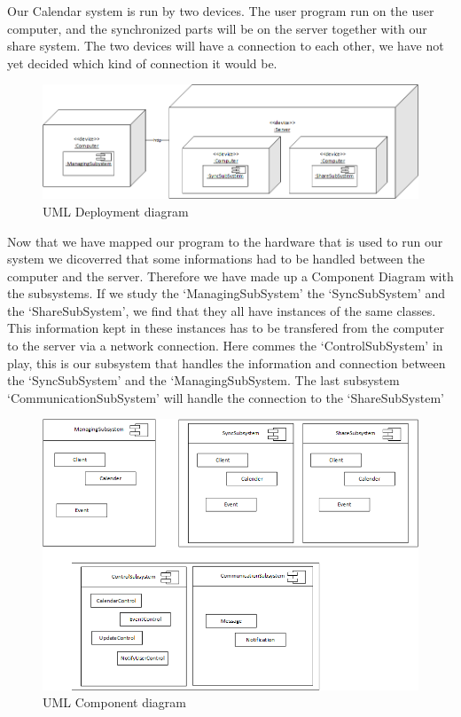 Our Calendar system is run by two devices. The user program run on the user computer, and the synchronized parts will be on the server together with our share system. The two devices will have a connection to each other, we have not yet decided which kind of connection it would be.

\begin{figure}[ht!]
\centering
\includegraphics[width=160mm]{UMLDeployment.png}
\caption{UML Deployment diagram \label{overflow}}
\end{figure}

Now that we have mapped our program to the hardware that is used to run our system we dicoverred that some informations had to be handled between the computer and the server. Therefore we have made up a Component Diagram with the subsystems. If we study the ‘ManagingSubSystem’ the ‘SyncSubSystem’ and the ‘ShareSubSystem’, we find that they all have instances of the same classes. This information kept in these instances has to be transfered from the computer to the server via a network connection. Here commes the ‘ControlSubSystem’ in play, this is our subsystem that handles the information and connection between the ‘SyncSubSystem’ and the ‘ManagingSubSystem. The last subsystem ‘CommunicationSubSystem’ will handle the connection to the ‘ShareSubSystem’

\begin{figure}[ht!]
\centering
\includegraphics[width=160mm]{UMLComponent.png}
\caption{UML Component diagram \label{overflow}}
\end{figure}


